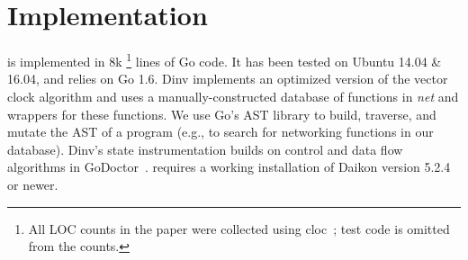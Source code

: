 \section{Implementation}
\label{sec:implementation}

\dinv is implemented in 8k \footnote{All LOC counts in the paper were
  collected using cloc~\cite{cloc}; test code is omitted from the
  counts.} lines of Go code. It has been tested on Ubuntu 14.04 \&
16.04, and relies on Go 1.6.
%
Dinv implements an optimized version of the vector clock algorithm and
uses a manually-constructed database of functions in \emph{net} and
wrappers for these functions.
We use Go's AST library to build, traverse, and mutate the AST of a
program (e.g., to search for networking functions in our
database).
Dinv's state instrumentation builds on control and data flow
algorithms in GoDoctor~\cite{godoctor}. %
\dinv requires a working installation of Daikon version 5.2.4 or newer.

%
